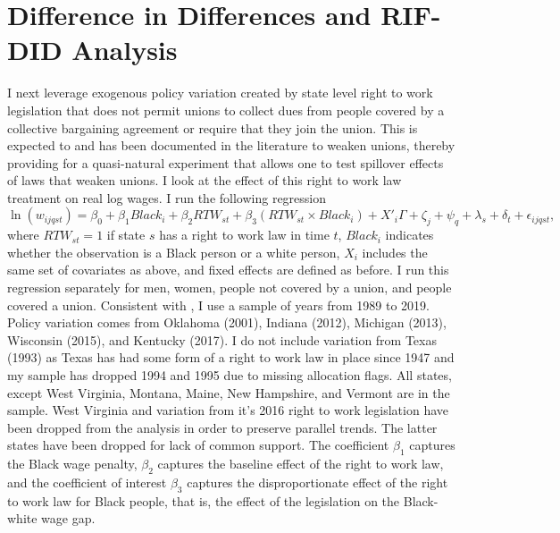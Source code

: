 \documentclass[11pt]{article}
\begin{document}
\section{Difference in Differences and RIF-DID Analysis}
I next leverage exogenous policy variation created by state level right to work legislation that does not permit unions to collect dues from people covered by a collective bargaining agreement or require that they join the union. This is expected to and has been documented in the literature to weaken unions, thereby providing for a quasi-natural experiment that allows one to test spillover effects of laws that weaken unions. I look at the effect of this right to work law treatment on real log wages. I run the following regression
\begin{equation}\label{eq:did}
\ln(w_{ijqst}) = \beta_0 + \beta_1Black_i + \beta_2RTW_{st} + \beta_3(RTW_{st}\times Black_i) + X'_i\Gamma +\zeta_j + \psi_q + \lambda_s + \delta_t + \epsilon_{ijqst},  
\end{equation}
where $RTW_{st} = 1$ if state $s$ has a right to work law in time $t$, $Black_i$ indicates whether the observation is a Black person or a white person, $X_i$ includes the same set of covariates as above, and fixed effects are defined as before. I run this regression separately for men, women, people not covered by a union, and people covered a union. Consistent with \cite{taschereau-dumouchel2020}, I use a sample of years from 1989 to 2019. Policy variation comes from Oklahoma (2001), Indiana (2012), Michigan (2013), Wisconsin (2015), and Kentucky (2017). I do not include variation from Texas (1993) as Texas has had some form of a right to work law in place since 1947 and my sample has dropped 1994 and 1995 due to missing allocation flags. All states, except West Virginia, Montana, Maine, New Hampshire, and Vermont are in the sample. West Virginia and variation from it's 2016 right to work legislation have been dropped from the analysis in order to preserve parallel trends. The latter states have been dropped for lack of common support. The coefficient $\beta_1$ captures the Black wage penalty, $\beta_2$ captures the baseline effect of the right to work law, and the coefficient of interest $\beta_3$ captures the disproportionate effect of the right to work law for Black people, that is, the effect of the legislation on the Black-white wage gap.
\end{document}
